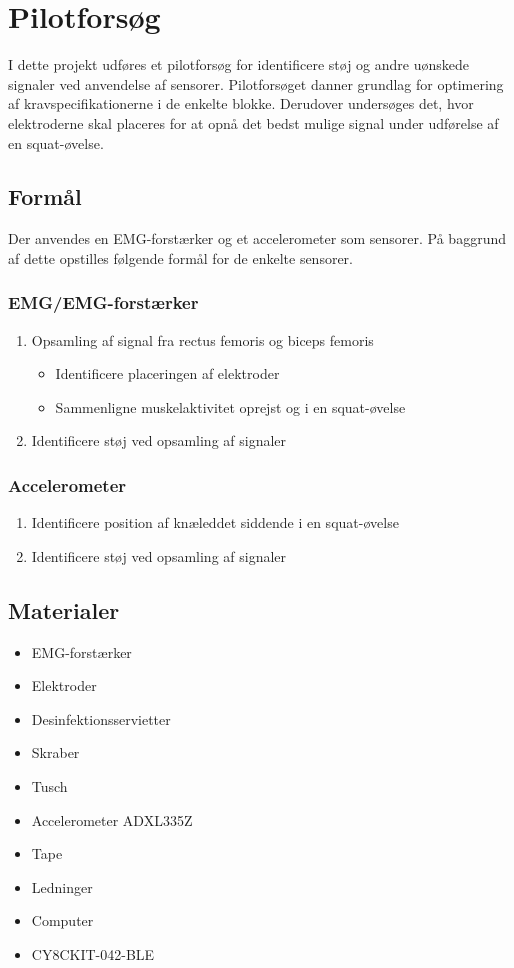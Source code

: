 \section{Pilotforsøg}
I dette projekt udføres et pilotforsøg for identificere støj og andre uønskede signaler ved anvendelse af sensorer. Pilotforsøget danner grundlag for optimering af kravspecifikationerne i de enkelte blokke. Derudover undersøges det, hvor elektroderne skal placeres for at opnå det bedst mulige signal under udførelse af en squat-øvelse.

\subsection{Formål}
Der anvendes en EMG-forstærker og et accelerometer som sensorer. På baggrund af dette opstilles følgende formål for de enkelte sensorer.  

\subsubsection{EMG/EMG-forstærker}
\begin{enumerate}
\item Opsamling af signal fra rectus femoris og biceps femoris
\begin{itemize}
\item Identificere placeringen af elektroder
\item Sammenligne muskelaktivitet oprejst og i en squat-øvelse 
\end{itemize}
\item Identificere støj ved opsamling af signaler
\end{enumerate}


\subsubsection{Accelerometer}
\begin{enumerate}
\item Identificere position af knæleddet siddende i en squat-øvelse
\item Identificere støj ved opsamling af signaler
\end{enumerate}


\subsection{Materialer} 
\begin{itemize}
\item EMG-forstærker
\item Elektroder
\item Desinfektionsservietter
\item Skraber
\item Tusch 

\item Accelerometer ADXL335Z
\item Tape
\item Ledninger

\item Computer
\item CY8CKIT-042-BLE
\end{itemize}

